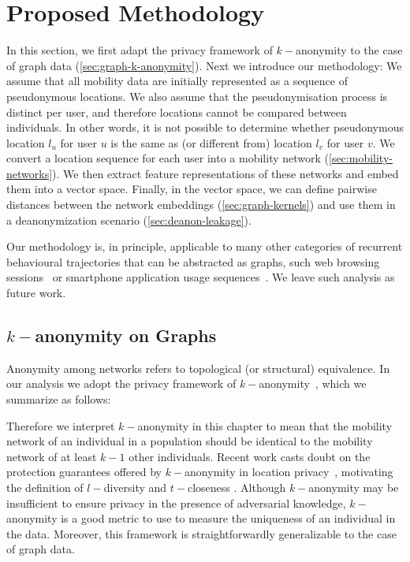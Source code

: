 \section{Proposed Methodology\label{sec:methodology}}

 In this section, we first adapt the privacy framework of $k-$anonymity to the case of graph data (\cref{sec:graph-k-anonymity}). Next we introduce our methodology: We assume that all mobility data are initially represented as a sequence of pseudonymous locations.
We also assume that the pseudonymisation process is distinct per user, and therefore locations cannot be compared between individuals.
In other words, it is not possible to determine whether pseudonymous location $l_u$ for user $u$ is the same as (or different from) location $l_v$ for user $v$.
We convert a location sequence for each user into a mobility network (\cref{sec:mobility-networks}). 
We then extract feature representations of these networks and embed them into a vector space.
Finally, in the vector space, we can define pairwise distances between the network embeddings (\cref{sec:graph-kernels}) and use them in a deanonymization scenario (\cref{sec:deanon-leakage}).  

Our methodology is, in principle, applicable to many other categories of recurrent behavioural trajectories that can be abstracted as graphs, such web browsing sessions~\cite{olejnik14, yen12} or smartphone application usage sequences~\cite{Welke2016}.
We leave such analysis as future work.

\subsection{$k-$anonymity on Graphs\label{sec:graph-k-anonymity}}

Anonymity among networks refers to topological (or structural) equivalence. In our analysis we adopt the privacy framework of $k-$anonymity~\cite{sweeney2002k}, which we summarize as follows:


\vspace{.4cm}
Therefore we interpret $k-$anonymity in this chapter to mean that the mobility network of an individual in a population should be identical to the mobility network of at least $k-1$ other individuals.
Recent work casts doubt on the protection guarantees offered by \mbox{$k-$anonymity} in location privacy~\cite{shokri2010}, motivating the definition of $l-$diversity \cite{Machanavajjhala2007} and $t-$closeness \cite{li2007}.
Although $k-$anonymity may be insufficient to ensure privacy in the presence of adversarial knowledge, \mbox{$k-$anonymity} is a good metric to use to measure the uniqueness of an individual in the data.
Moreover, this framework is straightforwardly generalizable to the case of graph data.

